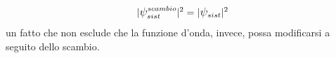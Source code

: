 \begin{equation}
    |\mathlarger{\psi}_{sist}^{scambio}|^2 = |\mathlarger{\psi}_{sist}|^2
    \label{eq:indistinguishable-particles-principle}
\end{equation}
un fatto che non esclude che la funzione d’onda, invece, possa modificarsi a seguito dello scambio.
\bigskip

